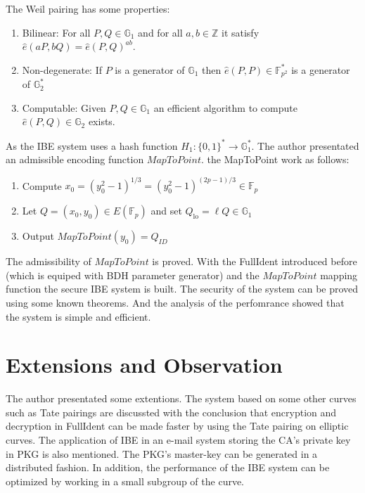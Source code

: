 \documentclass[runningheads,a4paper]{llncs}
\begin{document}
The Weil pairing has some properties:
\begin{enumerate}
	\item Bilinear: For all $P,Q\in \mathbb{G}_1$ and for all $a,b\in \mathbb{Z}$ it satisfy $\hat{e}(a P, b Q)=\hat{e}(P, Q)^{a b}$.
	\item Non-degenerate: If $P$ is a generator of $\mathbb{G}_1$ then $\hat{e}(P, P) \in \mathbb{F}_{p^{2}}^{*}$ is a generator of $\mathbb{G}_2^*$
	\item Computable: Given $P, Q \in \mathbb{G}_{1}$ an efficient algorithm to compute $\hat{e}(P, Q) \in \mathbb{G}_{2}$ exists.
\end{enumerate}

As the IBE system uses a hash function $H_1:\{0,1\}^*\rightarrow\mathbb{G}_1^*$. The author presentated an admissible encoding function $MapToPoint$.
the MapToPoint work as follows:
\begin{enumerate}
	\item Compute $x_{0}=\left(y_{0}^{2}-1\right)^{1 / 3}=\left(y_{0}^{2}-1\right)^{(2 p-1) / 3} \in \mathbb{F}_{p}$
	\item Let $Q=\left(x_{0}, y_{0}\right) \in E\left(\mathbb{F}_{p}\right)$ and set $Q_{\mathrm{lo}}=\ell Q \in \mathbb{G}_{1}$
	\item Output $MapToPoint(y_0)=Q_{ID}$ 
\end{enumerate}
The admissibility of $MapToPoint$ is proved. With the FullIdent introduced before (which is equiped with BDH parameter generator) and the $MapToPoint$ mapping function the secure IBE system is built. The security of the system can be proved using some known theorems. And the analysis of the perfomrance showed that the system is simple and efficient.

\section{Extensions and Observation}
The author presentated some extentions. The system based on some other curves such as Tate pairings are discussted with the conclusion that encryption and decryption in FullIdent can be made faster by using the Tate pairing on elliptic curves. The application of IBE in an e-mail system storing the CA's private key in PKG is also mentioned. The PKG's master-key can be generated in a distributed fashion. In addition, the performance of the IBE system can be optimized by working in a small subgroup of the curve. 
\end{document}
